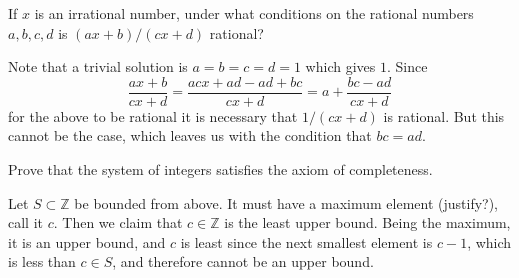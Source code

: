   \begin{exercise}[Olmsted 1.7]
    If $x$ is an irrational number, under what conditions on the rational numbers $a, b, c, d$ is $(ax + b)/(cx + d)$ rational? 
  \end{exercise}
  \begin{solution}
    Note that a trivial solution is $a = b = c = d = 1$ which gives $1$. Since 
    \begin{equation}
      \frac{ax + b}{cx + d} = \frac{acx + ad - ad + bc}{cx + d} = a + \frac{bc - ad}{cx + d} 
    \end{equation}
    for the above to be rational it is necessary that $1/(cx + d)$ is rational. But this cannot be the case, which leaves us with the condition that $bc = ad$. 
  \end{solution}

  \begin{exercise}[Olmsted 1.8]
    Prove that the system of integers satisfies the axiom of completeness. 
  \end{exercise}
  \begin{solution}
    Let $S \subset \mathbb{Z}$ be bounded from above. It must have a maximum element (justify?), call it $c$. Then we claim that $c \in \mathbb{Z}$ is the least upper bound. Being the maximum, it is an upper bound, and $c$ is least since the next smallest element is $c-1$, which is less than $c \in S$, and therefore cannot be an upper bound. 
  \end{solution}

